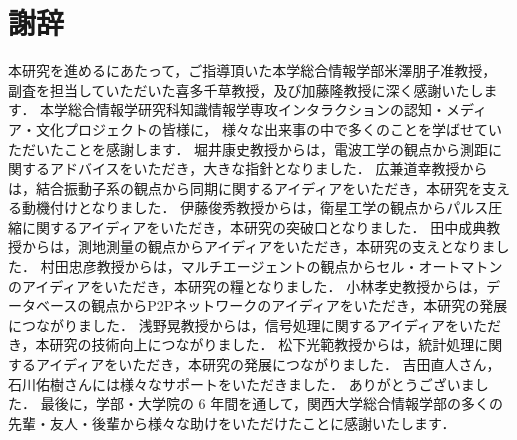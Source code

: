 \chapter*{謝辞}

本研究を進めるにあたって，ご指導頂いた本学総合情報学部米澤朋子准教授，
副査を担当していただいた喜多千草教授，及び加藤隆教授に深く感謝いたします．
本学総合情報学研究科知識情報学専攻インタラクションの認知・メディア・文化プロジェクトの皆様に，
様々な出来事の中で多くのことを学ばせていただいたことを感謝します．
堀井康史教授からは，電波工学の観点から測距に関するアドバイスをいただき，大きな指針となりました．
広兼道幸教授からは，結合振動子系の観点から同期に関するアイディアをいただき，本研究を支える動機付けとなりました．
伊藤俊秀教授からは，衛星工学の観点からパルス圧縮に関するアイディアをいただき，本研究の突破口となりました．
田中成典教授からは，測地測量の観点からアイディアをいただき，本研究の支えとなりました．
村田忠彦教授からは，マルチエージェントの観点からセル・オートマトンのアイディアをいただき，本研究の糧となりました．
小林孝史教授からは，データベースの観点からP2Pネットワークのアイディアをいただき，本研究の発展につながりました．
浅野晃教授からは，信号処理に関するアイディアをいただき，本研究の技術向上につながりました．
松下光範教授からは，統計処理に関するアイディアをいただき，本研究の発展につながりました．
吉田直人さん，石川佑樹さんには様々なサポートをいただきました．
ありがとうございました．
最後に，学部・大学院の 6 年間を通して，関西大学総合情報学部の多くの先輩・友人・後輩から様々な助けをいただけたことに感謝いたします．
